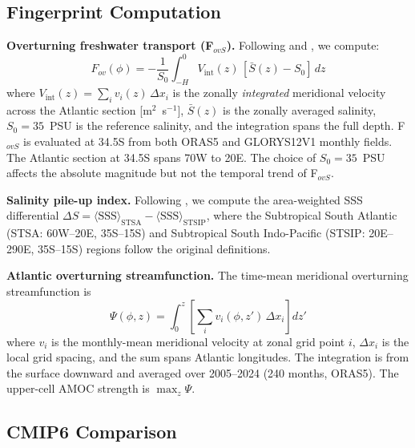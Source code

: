\documentclass{agujournal2019}
\begin{document}
\subsection{Fingerprint Computation}

\textbf{Overturning freshwater transport (F$_{ovS}$).} Following  and , we compute:
\begin{equation}
F_{ov}(\phi) = -\frac{1}{S_0} \int_{-H}^{0} V_\mathrm{int}(z)\,[\bar{S}(z) - S_0]\,dz
\label{eq:fovs}
\end{equation}
where $V_\mathrm{int}(z) = \sum_i v_i(z)\,\Delta x_i$ is the zonally \emph{integrated} meridional velocity across the Atlantic section [m$^2$~s$^{-1}$], $\bar{S}(z)$ is the zonally averaged salinity, $S_0 = 35$~PSU is the reference salinity, and the integration spans the full depth. F$_{ovS}$ is evaluated at 34.5\textdegree S from both ORAS5 and GLORYS12V1 monthly fields. The Atlantic section at 34.5\textdegree S spans 70\textdegree W to 20\textdegree E. The choice of $S_0 = 35$~PSU affects the absolute magnitude but not the temporal trend of F$_{ovS}$.

\textbf{Salinity pile-up index.} Following , we compute the area-weighted SSS differential $\Delta S = \langle\text{SSS}\rangle_\text{STSA} - \langle\text{SSS}\rangle_\text{STSIP}$, where the Subtropical South Atlantic (STSA: 60\textdegree W--20\textdegree E, 35\textdegree S--15\textdegree S) and Subtropical South Indo-Pacific (STSIP: 20\textdegree E--290\textdegree E, 35\textdegree S--15\textdegree S) regions follow the original definitions.

\textbf{Atlantic overturning streamfunction.} The time-mean meridional overturning streamfunction is
\begin{equation}
\Psi(\phi, z) = \int_0^z \left[\sum_i v_i(\phi, z')\,\Delta x_i\right] dz'
\label{eq:moc}
\end{equation}
where $v_i$ is the monthly-mean meridional velocity at zonal grid point $i$, $\Delta x_i$ is the local grid spacing, and the sum spans Atlantic longitudes. The integration is from the surface downward and averaged over 2005--2024 (240 months, ORAS5). The upper-cell AMOC strength is $\max_z \Psi$.

\subsection{CMIP6 Comparison}
\end{document}
